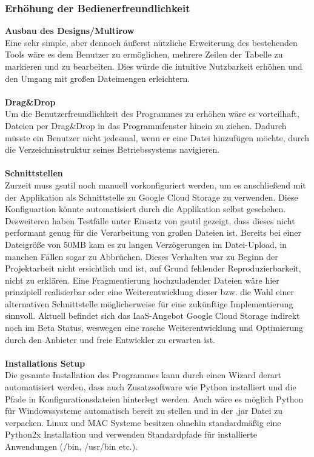 \documentclass[13pt,a4paper,bibliography=totocnumbered,listof=totocnumbered]{scrartcl}
\begin{document}
\subsubsection{Erhöhung der Bedienerfreundlichkeit}
\textbf{Ausbau des Designs/Multirow}\\
Eine sehr simple, aber dennoch äußerst nützliche Erweiterung des bestehenden Tools wäre es dem Benutzer zu ermöglichen, mehrere Zeilen der Tabelle zu markieren und zu bearbeiten. Dies würde die intuitive Nutzbarkeit erhöhen und den Umgang mit großen Dateimengen erleichtern. \\
\\\textbf{Drag\&Drop}\\
Um die Benutzerfreundlichkeit des Programmes zu erhöhen wäre es vorteilhaft, Dateien per Drag\&Drop in das Programmfenster hinein zu ziehen. Dadurch müsste ein Benutzer nicht jedesmal, wenn er eine Datei hinzufügen möchte, durch die Verzeichnisstruktur seines Betriebssystems navigieren.\\
\\\textbf{Schnittstellen}\\
Zurzeit muss gsutil noch manuell vorkonfiguriert werden, um es anschließend mit der Applikation als Schnittstelle zu Google Cloud Storage zu verwenden. Diese Konfiguartion könnte automatisiert durch die Applikation selbst geschehen. Desweiteren haben Testfälle unter Einsatz von gsutil gezeigt, dass dieses nicht performant genug für die Verarbeitung von großen Dateien ist. Bereits bei einer Dateigröße von 50MB kam es zu langen Verzögerungen im Datei-Upload, in manchen Fällen sogar zu Abbrüchen. Dieses Verhalten war zu Beginn der Projektarbeit nicht ersichtlich und ist, auf Grund fehlender Reproduzierbarkeit, nicht zu erklären. Eine Fragmentierung hochzuladender Dateien wäre hier prinzipiell realisierbar oder eine Weiterentwicklung dieser bzw. die Wahl einer alternativen Schnittstelle möglicherweise für eine zukünftige Implementierung sinnvoll. Aktuell befindet sich das IaaS-Angebot Google Cloud Storage indirekt noch im Beta Status, weswegen eine rasche Weiterentwicklung und Optimierung durch den Anbieter und freie Entwickler zu erwarten ist.\\
\pagebreak
\\\textbf{Installations Setup}\\
Die gesamte Installation des Programmes kann durch einen Wizard derart automatisiert werden, dass auch Zusatzsoftware wie Python installiert und die Pfade in Konfigurationsdateien hinterlegt werden. Auch wäre es möglich Python für Windowssysteme automatisch bereit zu stellen und in der .jar Datei zu verpacken. Linux und MAC Systeme besitzen ohnehin standardmäßig eine Python2x Installation und verwenden Standardpfade für installierte Anwendungen (/bin, /usr/bin etc.).\\
\end{document}
